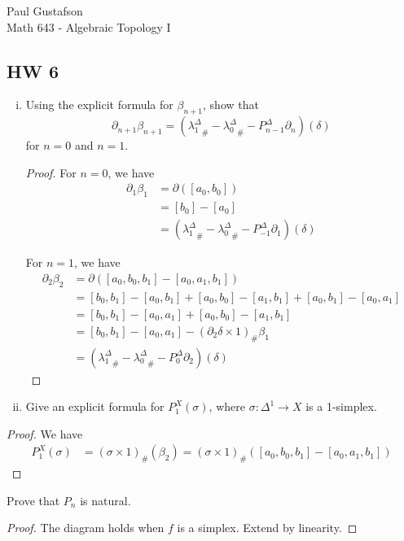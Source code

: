 \documentclass{article}
\begin{document}
\noindent Paul Gustafson\\
\noindent Math 643 - Algebraic Topology I

\subsection*{HW 6}
 \begin{enumerate}[(i)]
\item Using the explicit formula for $\beta_{n+1}$, show that
$$\partial_{n+1} \beta_{n+1} = ( {\lambda_1^\Delta}_\# - {\lambda_0^\Delta}_\# - P^\Delta_{n-1} \partial_n)(\delta)$$
for $n = 0$ and $n=1$.

\begin{proof}

For $n=0$, we have
\begin{align*}
\partial_1 \beta_1 & = \partial ([a_0, b_0]) \\
& = [b_0] - [a_0] \\
& = ( {\lambda_1^\Delta}_\# - {\lambda_0^\Delta}_\# - P^\Delta_{-1} \partial_1)(\delta) 
\end{align*}


For $n=1$, we have 
\begin{align*}
\partial_2 \beta_2 & = \partial ([a_0, b_0, b_1] - [a_0, a_1, b_1]) \\
& = [b_0,b_1] - [a_0,b_1] + [a_0, b_0] - [a_1, b_1] + [a_0, b_1] - [a_0, a_1] \\
& = [b_0,b_1]  - [a_0, a_1] + [a_0, b_0] - [a_1, b_1] \\
& = [b_0,b_1]  - [a_0, a_1] - (\partial_2 \delta \times 1)_\# \beta_1 \\
& = ( {\lambda_1^\Delta}_\# - {\lambda_0^\Delta}_\# - P^\Delta_{0} \partial_2)(\delta) 
\end{align*}
\end{proof}

\item Give an explicit formula for $P_1^X(\sigma)$, where $\sigma: \Delta^1 \to X$ is a 1-simplex.
\end{enumerate}
\begin{proof}
We have 
\begin{align*}
P_1^X(\sigma) & = (\sigma \times 1)_\#(\beta_2)
 = (\sigma \times 1)_\#([a_0,b_0, b_1] - [a_0, a_1, b_1])
\end{align*}
\end{proof}

 Prove that $P_n$ is natural.
\begin{proof}
The diagram holds when $f$ is a simplex.  Extend by linearity.
\end{proof}
\end{document}
